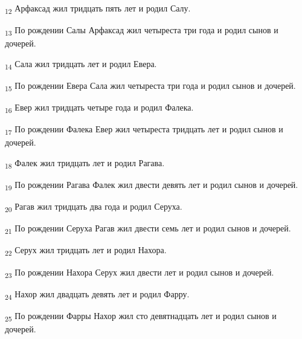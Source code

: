 \begin{tcolorbox}
\textsubscript{12} Арфаксад жил тридцать пять лет и родил Салу.
\end{tcolorbox}
\begin{tcolorbox}
\textsubscript{13} По рождении Салы Арфаксад жил четыреста три года и родил сынов и дочерей.
\end{tcolorbox}
\begin{tcolorbox}
\textsubscript{14} Сала жил тридцать лет и родил Евера.
\end{tcolorbox}
\begin{tcolorbox}
\textsubscript{15} По рождении Евера Сала жил четыреста три года и родил сынов и дочерей.
\end{tcolorbox}
\begin{tcolorbox}
\textsubscript{16} Евер жил тридцать четыре года и родил Фалека.
\end{tcolorbox}
\begin{tcolorbox}
\textsubscript{17} По рождении Фалека Евер жил четыреста тридцать лет и родил сынов и дочерей.
\end{tcolorbox}
\begin{tcolorbox}
\textsubscript{18} Фалек жил тридцать лет и родил Рагава.
\end{tcolorbox}
\begin{tcolorbox}
\textsubscript{19} По рождении Рагава Фалек жил двести девять лет и родил сынов и дочерей.
\end{tcolorbox}
\begin{tcolorbox}
\textsubscript{20} Рагав жил тридцать два года и родил Серуха.
\end{tcolorbox}
\begin{tcolorbox}
\textsubscript{21} По рождении Серуха Рагав жил двести семь лет и родил сынов и дочерей.
\end{tcolorbox}
\begin{tcolorbox}
\textsubscript{22} Серух жил тридцать лет и родил Нахора.
\end{tcolorbox}
\begin{tcolorbox}
\textsubscript{23} По рождении Нахора Серух жил двести лет и родил сынов и дочерей.
\end{tcolorbox}
\begin{tcolorbox}
\textsubscript{24} Нахор жил двадцать девять лет и родил Фарру.
\end{tcolorbox}
\begin{tcolorbox}
\textsubscript{25} По рождении Фарры Нахор жил сто девятнадцать лет и родил сынов и дочерей.
\end{tcolorbox}
